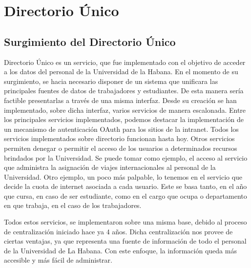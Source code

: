\chapter{Directorio Único}

\section{Surgimiento del Directorio Único}

Directorio Único es un servicio, que fue implementado con el objetivo de acceder a los datos 
del personal de la Universidad de la Habana. En el momento de su surgimiento, se hacia 
necesario disponer de un sistema que unificara las principales fuentes de datos de 
trabajadores y estudiantes. De esta manera sería factible presentarlas a través de una misma
interfaz. Desde su creación se han implementado, sobre dicha interfaz, varios 
servicios de manera escalonada. Entre los principales servicios implementados, podemos 
destacar la implementación de un mecanismo de autenticación OAuth para los sitios de la 
intranet. Todos los servicios implementados sobre directorio funcionan hasta hoy. Otros 
servicios permiten denegar o permitir el acceso de los usuarios a determinados recursos 
brindados por la Universidad. Se puede tomar como ejemplo, el acceso al servicio que 
administra la asignación de viajes internacionales al personal de la Universidad. Otro 
ejemplo, un poco más palpable, lo tenemos en el servicio que decide la cuota de internet 
asociada a cada usuario. Este se basa tanto, en el año que cursa, en caso de ser estudiante,
como en el cargo que ocupa o departamento en que trabaja, en el caso de los trabajadores.

Todos estos servicios, se implementaron sobre una misma base, debido al proceso de 
centralización iniciado hace ya 4 años. Dicha centralización nos provee de ciertas ventajas,
ya que representa una fuente de información de todo el personal de la Universidad de La 
Habana. Con este enfoque, la información queda más accesible y más fácil de administrar. 

